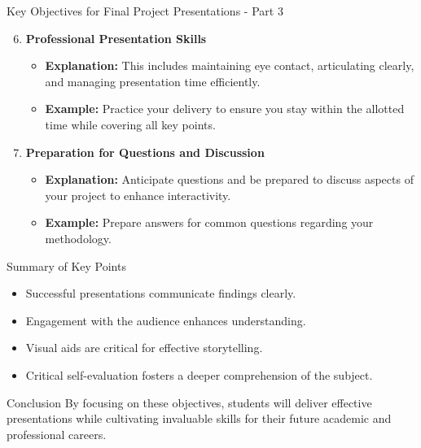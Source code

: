 \documentclass[aspectratio=169]{beamer}
\begin{document}
\begin{frame}[fragile]{Key Objectives for Final Project Presentations - Part 3}
  \begin{enumerate}
    \setcounter{enumi}{5}
    \item \textbf{Professional Presentation Skills}
      \begin{itemize}
        \item \textbf{Explanation:} This includes maintaining eye contact, articulating clearly, and managing presentation time efficiently.
        \item \textbf{Example:} Practice your delivery to ensure you stay within the allotted time while covering all key points.
      \end{itemize}

    \item \textbf{Preparation for Questions and Discussion}
      \begin{itemize}
        \item \textbf{Explanation:} Anticipate questions and be prepared to discuss aspects of your project to enhance interactivity.
        \item \textbf{Example:} Prepare answers for common questions regarding your methodology.
      \end{itemize}
  \end{enumerate}
\end{frame}

\begin{frame}[fragile]{Summary of Key Points}
  \begin{itemize}
    \item Successful presentations communicate findings clearly.
    \item Engagement with the audience enhances understanding.
    \item Visual aids are critical for effective storytelling.
    \item Critical self-evaluation fosters a deeper comprehension of the subject.
  \end{itemize}
  
  \begin{block}{Conclusion}
    By focusing on these objectives, students will deliver effective presentations while cultivating invaluable skills for their future academic and professional careers.
  \end{block}
\end{frame}
\end{document}
